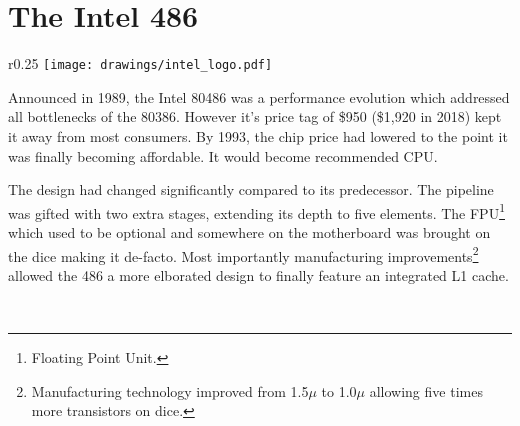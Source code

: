 \section{The Intel 486}

\begin{wrapfigure}[5]{r}{0.25\textwidth}
\centering
\texttt{[image: drawings/intel\_logo.pdf]}
\end{wrapfigure}

Announced in 1989, the Intel 80486 was a performance evolution which addressed all bottlenecks of the 80386. However it's price tag of \$950 (\$1,920 in 2018) kept it away from most consumers. By 1993, the chip price had lowered to the point it was finally becoming affordable. It would become \doom{} recommended CPU.\\
\par
The design had changed significantly compared to its predecessor. The pipeline was gifted with two extra stages, extending its depth to five elements. The FPU\footnote{Floating Point Unit.} which used to be optional and somewhere on the motherboard was brought on the dice making it de-facto. Most importantly manufacturing improvements\footnote{Manufacturing technology improved from 1.5$\mu$ to 1.0$\mu$ allowing five times more transistors on dice.} allowed the 486 a more elborated design to finally feature an integrated L1 cache.\\
\par
{}\\
\par

